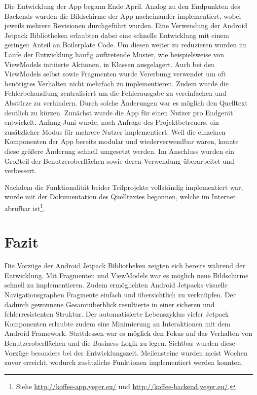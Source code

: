 \documentclass[a4paper, 11pt]{article}
\begin{document}
Die Entwicklung der App begann Ende April.
Analog zu den Endpunkten des Backends wurden die Bildschirme der App nacheinander implementiert, wobei jeweils mehrere Revisionen durchgeführt wurden.
Eine Verwendung der Android Jetpack Bibliotheken erlaubten dabei eine schnelle Entwicklung mit einem geringen Anteil an Boilerplate Code.
Um diesen weiter zu reduzieren wurden im Laufe der Entwicklung häufig auftretende Muster, wie beispielsweise von ViewModels initiierte Aktionen, in Klassen ausgelagert.
Auch bei den ViewModels selbst sowie Fragmenten wurde Vererbung verwendet um oft benötigtes Verhalten nicht mehrfach zu implementieren.
Zudem wurde die Fehlerbehandlung zentralisiert um die Fehlerausgabe zu vereinfachen und Abstürze zu verhindern.
Durch solche Änderungen war es möglich den Quelltext deutlich zu kürzen.
Zunächst wurde die App für einen Nutzer pro Endgerät entwickelt.
Anfang Juni wurde, nach Anfrage des Projektbetreuers, ein zusätzlicher Modus für mehrere Nutzer implementiert.
Weil die einzelnen Komponenten der App bereits modular und wiederverwendbar waren, konnte diese größere Änderung schnell umgesetzt werden. 
Im Anschluss wurden ein Großteil der Benutzeroberflächen sowie deren Verwendung überarbeitet und verbessert.

Nachdem die Funktionalität beider Teilprojekte vollständig implementiert war, wurde mit der Dokumentation des Quelltextes begonnen, welche im Internet abrufbar ist\footnote{Siehe \url{http://koffee-app.yeger.eu/} und \url{http://koffee-backend.yeger.eu/}.}.

\section{Fazit}
\label{sec:conclusion}

Die Vorzüge der Android Jetpack Bibliotheken zeigten sich bereits während der Entwicklung.
Mit Fragmenten und ViewModels war es möglich neue Bildschirme schnell zu implementieren.
Zudem ermöglichten Android Jetpacks visuelle Navigationsgraphen Fragmente einfach und übersichtlich zu verknüpfen.
Der dadurch gewonnene Gesamtüberblick resultierte in einer sicheren und fehlerresistenten Struktur.
Der automatisierte Lebenszyklus vieler Jetpack Komponenten erlaubte zudem eine Minimierung an Interaktionen mit dem Android Framework.
Stattdessen war es möglich den Fokus auf das Verhalten von Benutzeroberflächen und die Business Logik zu legen.
Sichtbar wurden diese Vorzüge besonders bei der Entwicklungszeit.
Meilensteine wurden meist Wochen zuvor erreicht, wodurch zusätzliche Funktionen implementiert werden konnten.
\end{document}
